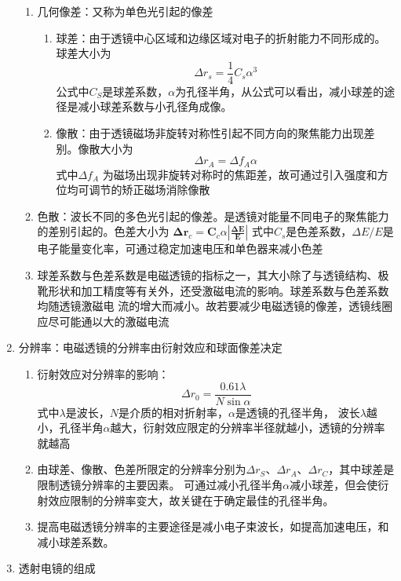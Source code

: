 \documentclass[12pt,a4paper]{article}
\begin{document}
\begin{enumerate}
\begin{enumerate}
            \item 几何像差：又称为单色光引起的像差
            \begin{enumerate}
                \item 球差：由于透镜中心区域和边缘区域对电子的折射能力不同形成的。球差大小为$$\Delta r_{s}=\frac{1}{4} C_{s} \alpha^{3}$$
                    公式中$C_{S}$是球差系数，$\alpha$为孔径半角，从公式可以看出，减小球差的途径是减小球差系数与小孔径角成像。
                \item 像散：由于透镜磁场非旋转对称性引起不同方向的聚焦能力出现差别。像散大小为$$\Delta r_{A}=\Delta f_{A} \alpha$$式中$\Delta f_{A}$
                    为磁场出现非旋转对称时的焦距差，故可通过引入强度和方位均可调节的矫正磁场消除像散
            \end{enumerate}
            \item 色散：波长不同的多色光引起的像差。是透镜对能量不同电子的聚焦能力的差别引起的。色差大小为
                $\boldsymbol{\Delta} \boldsymbol{r}_{c}=\boldsymbol{C}_{c} \alpha\left|\frac{\boldsymbol{\Delta} \boldsymbol{E}}{\boldsymbol{E}}\right|$
                式中$C_{s}$是色差系数，$\Delta E / E$是电子能量变化率，可通过稳定加速电压和单色器来减小色差
            \item 球差系数与色差系数是电磁透镜的指标之一，其大小除了与透镜结构、极靴形状和加工精度等有关外，还受激磁电流的影响。球差系数与色差系数均随透镜激磁电
                流的增大而减小。故若要减少电磁透镜的像差，透镜线圈应尽可能通以大的激磁电流
        \end{enumerate}
        \item 分辨率：电磁透镜的分辨率由衍射效应和球面像差决定
        \begin{enumerate}
            \item 衍射效应对分辨率的影响：$$\Delta r_{0}=\frac{0.61 \lambda}{N \sin \alpha}$$
                式中$\lambda$是波长，$N$是介质的相对折射率，$\alpha$是透镜的孔径半角，
                波长$\lambda$越小，孔径半角$\alpha$越大，衍射效应限定的分辨率半径就越小，透镜的分辨率就越高
            \item 由球差、像散、色差所限定的分辨率分别为$\Delta r_{S}$、$\Delta r_{A}$、$\Delta r_{C}$，其中球差是限制透镜分辨率的主要因素。
                可通过减小孔径半角$\alpha$减小球差，但会使衍射效应限制的分辨率变大，故关键在于确定最佳的孔径半角。
            \item 提高电磁透镜分辨率的主要途径是减小电子束波长，如提高加速电压，和减小球差系数。
        \end{enumerate}
        \item 透射电镜的组成

\end{enumerate}
\end{document}
